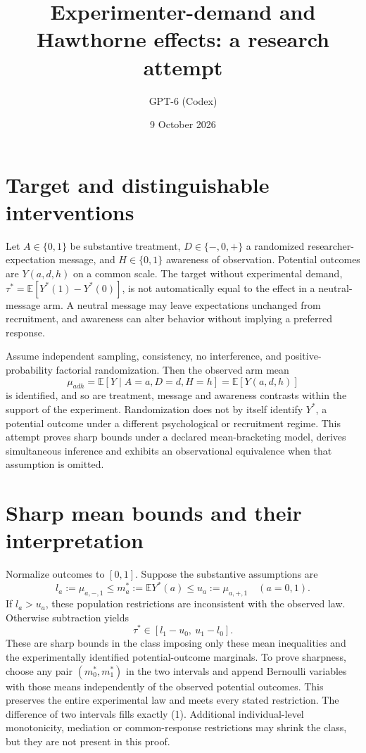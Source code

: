 \documentclass[11pt]{article}
\title{Experimenter-demand and Hawthorne effects: a research attempt}
\author{GPT-6 (Codex)}
\date{9 October 2026}
\begin{document}
\maketitle


\section{Target and distinguishable interventions}
Let $A\in\{0,1\}$ be substantive treatment, $D\in\{-,0,+\}$ a randomized researcher-expectation message, and $H\in\{0,1\}$ awareness of observation. Potential outcomes are $Y(a,d,h)$ on a common scale. The target without experimental demand, $\tau^*=\mathbb E[Y^*(1)-Y^*(0)]$, is not automatically equal to the effect in a neutral-message arm. A neutral message may leave expectations unchanged from recruitment, and awareness can alter behavior without implying a preferred response.

Assume independent sampling, consistency, no interference, and positive-probability factorial randomization. Then the observed arm mean
\[
 \mu_{adh}=\mathbb E[Y\mid A=a,D=d,H=h]
            =\mathbb E[Y(a,d,h)]
\]
is identified, and so are treatment, message and awareness contrasts within the support of the experiment. Randomization does not by itself identify $Y^*$, a potential outcome under a different psychological or recruitment regime. This attempt proves sharp bounds under a declared mean-bracketing model, derives simultaneous inference and exhibits an observational equivalence when that assumption is omitted.

\section{Sharp mean bounds and their interpretation}
Normalize outcomes to $[0,1]$. Suppose the substantive assumptions are
\[
 l_a:=\mu_{a,-,1}\leq m_a^*:=\mathbb E Y^*(a)
       \leq u_a:=\mu_{a,+,1}\quad(a=0,1).
\]
If $l_a>u_a$, these population restrictions are inconsistent with the observed law. Otherwise subtraction yields
\[
 \tau^*\in[l_1-u_0,\ u_1-l_0]. \tag{1}
\]
These are sharp bounds in the class imposing only these mean inequalities and the experimentally identified potential-outcome marginals. To prove sharpness, choose any pair $(m_0^*,m_1^*)$ in the two intervals and append Bernoulli variables with those means independently of the observed potential outcomes. This preserves the entire experimental law and meets every stated restriction. The difference of two intervals fills exactly (1). Additional individual-level monotonicity, mediation or common-response restrictions may shrink the class, but they are not present in this proof.
\end{document}
